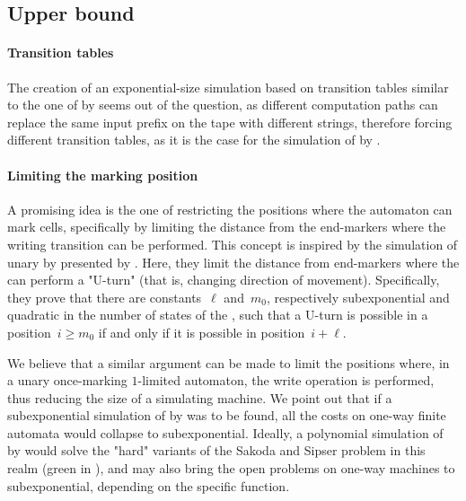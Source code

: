 \subsection{Upper bound}

\paragraph{Transition tables} The creation of an exponential-size simulation based on transition tables similar to the one of \TNFAs by \ODFAs seems out of the question, as different computation paths can replace the same input prefix on the tape with different strings, therefore forcing different transition tables, as it is the case for the simulation of \OLAs by \ODFAs.

\paragraph{Limiting the marking position} A promising idea is the one of restricting the positions where the automaton can mark cells, specifically by limiting the distance from the end-markers where the writing transition can be performed.
This concept is inspired by the simulation of unary \TNFAs by \ODFAs presented by .
Here, they limit the distance from end-markers where the \TNFA can perform a "U-turn" (that is, changing direction of movement).
Specifically, they prove that there are constants~$\ell$ and~$m_0$, respectively subexponential and quadratic in the number of states of the \TNFA, such that a U-turn is possible in a position~$i\ge m_0$ if and only if it is possible in position~$i+\ell$.

We believe that a similar argument can be made to limit the positions where, in a unary once-marking $1$-limited automaton, the write operation is performed, thus reducing the size of a simulating machine.
We point out that if a subexponential simulation of \OMOLAs by \ODFAs was to be found, all the costs on one-way finite automata would collapse to subexponential.
Ideally, a polynomial simulation of \OMOLAs by \TDFAs would solve the "hard" variants of the Sakoda and Sipser problem in this realm (green in ), and may also bring the open problems on one-way machines to subexponential, depending on the specific function.
